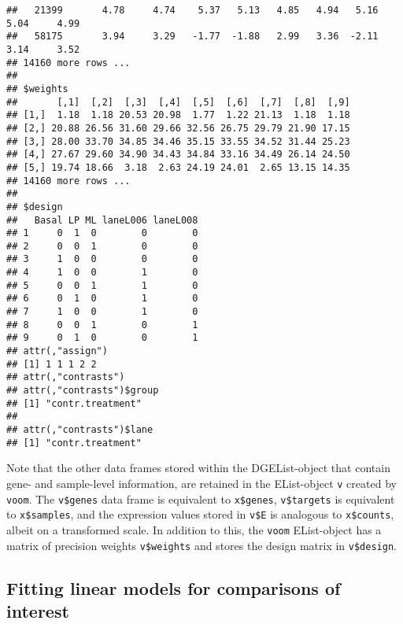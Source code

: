 \documentclass[10pt,a4paper]{extarticle}\usepackage[]{graphicx}\usepackage[]{color}
\makeatletter
\newenvironment{kframe}{%
 \def\at@end@of@kframe{}%
 \ifinner\ifhmode%
  \def\at@end@of@kframe{\end{minipage}}%
  \begin{minipage}{\columnwidth}%
 \fi\fi%
 \def\FrameCommand##1{\hskip\@totalleftmargin \hskip-\fboxsep
 \colorbox{shadecolor}{##1}\hskip-\fboxsep
     \hskip-\linewidth \hskip-\@totalleftmargin \hskip\columnwidth}%
 \MakeFramed {\advance\hsize-\width
   \@totalleftmargin\z@ \linewidth\hsize
   \@setminipage}}%
 {\par\unskip\endMakeFramed%
 \at@end@of@kframe}
\newenvironment{knitrout}{}{} %
\makeatother
\begin{document}
\begin{knitrout}
\begin{kframe}
\begin{verbatim}
##   21399       4.78     4.74    5.37   5.13   4.85   4.94   5.16     5.04     4.99
##   58175       3.94     3.29   -1.77  -1.88   2.99   3.36  -2.11     3.14     3.52
## 14160 more rows ...
## 
## $weights
##       [,1]  [,2]  [,3]  [,4]  [,5]  [,6]  [,7]  [,8]  [,9]
## [1,]  1.18  1.18 20.53 20.98  1.77  1.22 21.13  1.18  1.18
## [2,] 20.88 26.56 31.60 29.66 32.56 26.75 29.79 21.90 17.15
## [3,] 28.00 33.70 34.85 34.46 35.15 33.55 34.52 31.44 25.23
## [4,] 27.67 29.60 34.90 34.43 34.84 33.16 34.49 26.14 24.50
## [5,] 19.74 18.66  3.18  2.63 24.19 24.01  2.65 13.15 14.35
## 14160 more rows ...
## 
## $design
##   Basal LP ML laneL006 laneL008
## 1     0  1  0        0        0
## 2     0  0  1        0        0
## 3     1  0  0        0        0
## 4     1  0  0        1        0
## 5     0  0  1        1        0
## 6     0  1  0        1        0
## 7     1  0  0        1        0
## 8     0  0  1        0        1
## 9     0  1  0        0        1
## attr(,"assign")
## [1] 1 1 1 2 2
## attr(,"contrasts")
## attr(,"contrasts")$group
## [1] "contr.treatment"
## 
## attr(,"contrasts")$lane
## [1] "contr.treatment"
\end{verbatim}
\end{kframe}
\end{knitrout}

Note that the other data frames stored within the DGEList-object that contain gene- and sample-level information, are retained in the EList-object \texttt{v} created by \texttt{voom}. The \texttt{v\$genes} data frame is equivalent to \texttt{x\$genes}, \texttt{v\$targets} is equivalent to \texttt{x\$samples}, and the expression values stored in \texttt{v\$E} is analogous to \texttt{x\$counts}, albeit on a transformed scale. In addition to this, the \texttt{voom} EList-object has a matrix of precision weights \texttt{v\$weights} and stores the design matrix in \texttt{v\$design}.


\subsection*{Fitting linear models for comparisons of interest}
\end{document}
